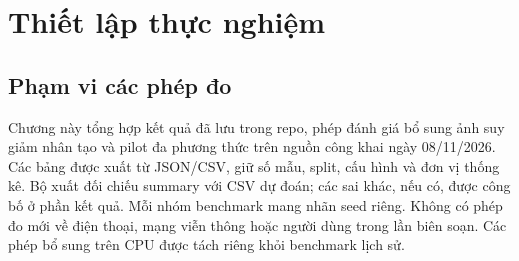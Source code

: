 \section{Thiết lập thực nghiệm}\label{sec:04-evaluation-setup}
\subsection{Phạm vi các phép đo}
Chương này tổng hợp kết quả đã lưu trong repo, phép đánh giá bổ sung ảnh suy giảm nhân tạo và pilot đa phương thức trên nguồn công khai ngày 08/11/2026. Các bảng được xuất từ JSON/CSV, giữ số mẫu, split, cấu hình và đơn vị thống kê. Bộ xuất đối chiếu summary với CSV dự đoán; các sai khác, nếu có, được công bố ở phần kết quả. Mỗi nhóm benchmark mang nhãn seed riêng. Không có phép đo mới về điện thoại, mạng viễn thông hoặc người dùng trong lần biên soạn. Các phép bổ sung trên CPU được tách riêng khỏi benchmark lịch sử.

